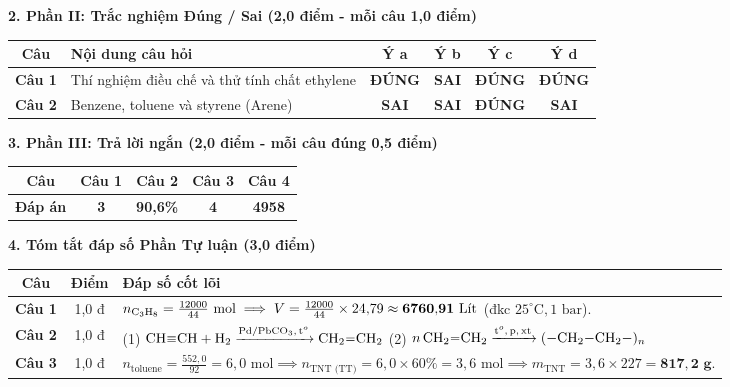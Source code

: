 \documentclass[11pt,a4paper]{article}
\begin{document}
\vspace{2pt}
\noindent
\textbf{\color{mainGreen}2. Phần II: Trắc nghiệm Đúng / Sai (2,0 điểm - mỗi câu 1,0 điểm)}
\begin{center}
\renewcommand{\arraystretch}{1.2}
\begin{tabular}{|c|l|c|c|c|c|}
\hline
\rowcolor{tableGreen}
\textbf{Câu} & \textbf{Nội dung câu hỏi} & \textbf{Ý a} & \textbf{Ý b} & \textbf{Ý c} & \textbf{Ý d} \\
\hline
\textbf{Câu 1} & Thí nghiệm điều chế và thử tính chất ethylene & \textbf{\color{hfRed}ĐÚNG} & \textbf{SAI} & \textbf{\color{hfRed}ĐÚNG} & \textbf{\color{hfRed}ĐÚNG} \\
\hline
\textbf{Câu 2} & Benzene, toluene và styrene (Arene) & \textbf{SAI} & \textbf{SAI} & \textbf{\color{hfRed}ĐÚNG} & \textbf{SAI} \\
\hline
\end{tabular}
\end{center}

\vspace{2pt}
\noindent
\textbf{\color{mainGreen}3. Phần III: Trả lời ngắn (2,0 điểm - mỗi câu đúng 0,5 điểm)}
\begin{center}
\renewcommand{\arraystretch}{1.2}
\begin{tabular}{|c|c|c|c|c|}
\hline
\rowcolor{tableGreen}
\textbf{Câu} & \textbf{Câu 1} & \textbf{Câu 2} & \textbf{Câu 3} & \textbf{Câu 4} \\
\hline
\textbf{Đáp án} & \textbf{\color{hfRed}3} & \textbf{\color{hfRed}90,6\%} & \textbf{\color{hfRed}4} & \textbf{\color{hfRed}4958} \\
\hline
\end{tabular}
\end{center}

\vspace{2pt}
\noindent
\textbf{\color{mainGreen}4. Tóm tắt đáp số Phần Tự luận (3,0 điểm)}
\begin{center}
\renewcommand{\arraystretch}{1.2}
\begin{tabular}{|c|c|p{11.5cm}|}
\hline
\rowcolor{tableGreen}
\textbf{Câu} & \textbf{Điểm} & \textbf{Đáp số cốt lõi} \\
\hline
\textbf{Câu 1} & 1,0 đ & $n_{\ce{C3H8}} = \frac{12000}{44}\text{ mol} \implies V = \frac{12000}{44} \times 24{,}79 \approx \mathbf{6760{,}91\text{ Lít}}$ (đkc $25^\circ\text{C}, 1\text{ bar}$). \\
\hline
\textbf{Câu 2} & 1,0 đ & (1) $\ce{CH#CH + H2 ->[Pd/PbCO3, t^o] CH2=CH2}$ \quad (2) $n\,\ce{CH2=CH2 ->[t^o, p, xt] (-CH2-CH2-)_n}$ \\
\hline
\textbf{Câu 3} & 1,0 đ & $n_{\text{toluene}} = \frac{552{,}0}{92} = 6{,}0\text{ mol} \implies n_{\text{TNT (TT)}} = 6{,}0 \times 60\% = 3{,}6\text{ mol} \implies m_{\text{TNT}} = 3{,}6 \times 227 = \mathbf{817{,}2\text{ g}}$. \\
\hline
\end{tabular}
\end{center}
\end{document}
